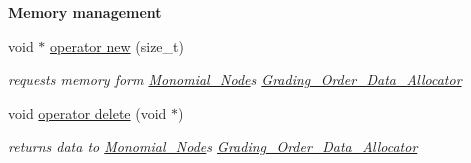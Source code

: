 \begin{Indent}\textbf{ Memory management}\par
\begin{DoxyCompactItemize}
\item 
\mbox{\label{group__polygroup_a556f9f54dca0f5407ec03c2ee88bac4b}} 
void $\ast$ \hyperlink{group__polygroup_a556f9f54dca0f5407ec03c2ee88bac4b}{operator new} (size\+\_\+t)
\begin{DoxyCompactList}\small\item\em requests memory form \hyperlink{group__polygroup_class_monomial___node}{Monomial\+\_\+\+Node}\textquotesingle{}s \hyperlink{group__memorygroup_class_grading___order___data___allocator}{Grading\+\_\+\+Order\+\_\+\+Data\+\_\+\+Allocator} \end{DoxyCompactList}\item 
\mbox{\label{group__polygroup_ae954b3ac41cf1c05b64c9b7f3c3d84a5}} 
void \hyperlink{group__polygroup_ae954b3ac41cf1c05b64c9b7f3c3d84a5}{operator delete} (void $\ast$)
\begin{DoxyCompactList}\small\item\em returns data to \hyperlink{group__polygroup_class_monomial___node}{Monomial\+\_\+\+Node}\textquotesingle{}s \hyperlink{group__memorygroup_class_grading___order___data___allocator}{Grading\+\_\+\+Order\+\_\+\+Data\+\_\+\+Allocator} \end{DoxyCompactList}\end{DoxyCompactItemize}
\end{Indent}
